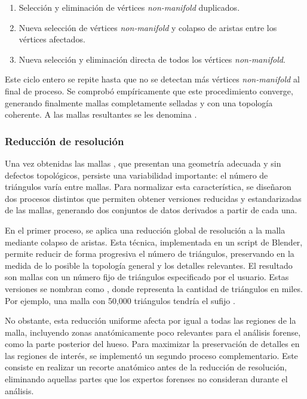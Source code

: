 \begin{enumerate}
    \item Selección y eliminación de vértices \textit{non-manifold} duplicados.
    \item Nueva selección de vértices \textit{non-manifold} y colapso de aristas entre los vértices afectados.
    \item Nueva selección y eliminación directa de todos los vértices \textit{non-manifold}.
\end{enumerate}
Este ciclo entero se repite hasta que no se detectan más vértices \textit{non-manifold} al final de proceso. Se comprobó empíricamente que este procedimiento converge, generando finalmente mallas completamente selladas y con una topología coherente. A las mallas resultantes se les denomina .

\subsubsection{Reducción de resolución}
\label{section4:data_reduction}
Una vez obtenidas las mallas , que presentan una geometría adecuada y sin defectos topológicos, persiste una variabilidad importante: el número de triángulos varía entre mallas. Para normalizar esta característica, se diseñaron dos procesos distintos que permiten obtener versiones reducidas y estandarizadas de las mallas, generando dos conjuntos de datos derivados a partir de cada una.

En el primer proceso, se aplica una reducción global de resolución a la malla  mediante colapso de aristas. Esta técnica, implementada en un script de Blender, permite reducir de forma progresiva el número de triángulos, preservando en la medida de lo posible la topología general y los detalles relevantes. El resultado son mallas con un número fijo de triángulos especificado por el usuario. Estas versiones se nombran como , donde  representa la cantidad de triángulos en miles. Por ejemplo, una malla con 50,000 triángulos tendría el sufijo .

No obstante, esta reducción uniforme afecta por igual a todas las regiones de la malla, incluyendo zonas anatómicamente poco relevantes para el análisis forense, como la parte posterior del hueso. Para maximizar la preservación de detalles en las regiones de interés, se implementó un segundo proceso complementario. Este consiste en realizar un recorte anatómico antes de la reducción de resolución, eliminando aquellas partes que los expertos forenses no consideran durante el análisis.

